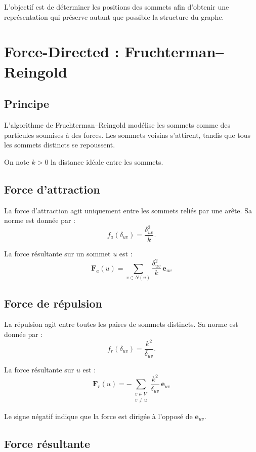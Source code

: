 \documentclass[a4paper,11pt]{article}
\begin{document}
L'objectif est de déterminer les positions des sommets
afin d'obtenir une représentation qui préserve autant
que possible la structure du graphe.

\section{Force-Directed : Fruchterman--Reingold}

\subsection{Principe}

L'algorithme de Fruchterman--Reingold modélise les sommets
comme des particules soumises à des forces. Les sommets
voisins s'attirent, tandis que tous les sommets distincts
se repoussent.

On note $k>0$ la distance idéale entre les sommets.

\subsection{Force d'attraction}

La force d'attraction agit uniquement entre les sommets
reliés par une arête. Sa norme est donnée par :
\[
f_a(\delta_{uv})=\frac{\delta_{uv}^2}{k}.
\]

La force résultante sur un sommet $u$ est :
\[
\boxed{
\mathbf{F}_a(u)
=
\sum_{v\in N(u)}
\frac{\delta_{uv}^2}{k}\,\mathbf{e}_{uv}
}
\]

\subsection{Force de répulsion}

La répulsion agit entre toutes les paires de sommets
distincts. Sa norme est donnée par :
\[
f_r(\delta_{uv})=\frac{k^2}{\delta_{uv}}.
\]

La force résultante sur $u$ est :
\[
\boxed{
\mathbf{F}_r(u)
=
-\sum_{\substack{v\in V\\v\neq u}}
\frac{k^2}{\delta_{uv}}\,\mathbf{e}_{uv}
}
\]

Le signe négatif indique que la force est dirigée à
l'opposé de $\mathbf{e}_{uv}$.

\subsection{Force résultante}
\end{document}

